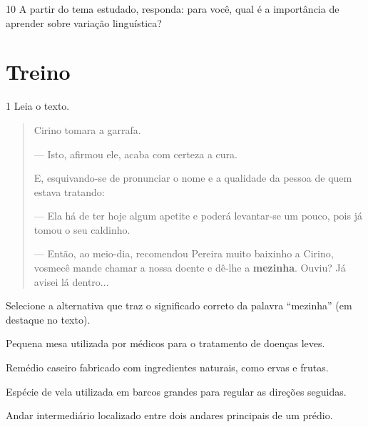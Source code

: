 \num{10} A partir do tema estudado, responda: para você, qual é a importância de
aprender sobre variação linguística?


\section{Treino}

\num{1} Leia o texto.

\begin{quote}
Cirino tomara a garrafa.

--- Isto, afirmou ele, acaba com certeza a cura.

E, esquivando-se de pronunciar o nome e a qualidade da pessoa de quem
estava tratando:

--- Ela há de ter hoje algum apetite e poderá levantar-se um pouco, pois
já tomou o seu caldinho.

--- Então, ao meio-dia, recomendou Pereira muito baixinho a Cirino,
vosmecê mande chamar a nossa doente e dê-lhe a \textbf{mezinha}. Ouviu?
Já avisei lá dentro...

\end{quote}

Selecione a alternativa que traz o significado correto da palavra ``mezinha'' (em destaque no texto).

\begin{escolha}
\item Pequena mesa utilizada por médicos para o tratamento de doenças leves.

\item Remédio caseiro fabricado com ingredientes naturais, como ervas e frutas.

\item Espécie de vela utilizada em barcos grandes para regular as direções seguidas.

\item Andar intermediário localizado entre dois andares principais de um prédio.
\end{escolha}


